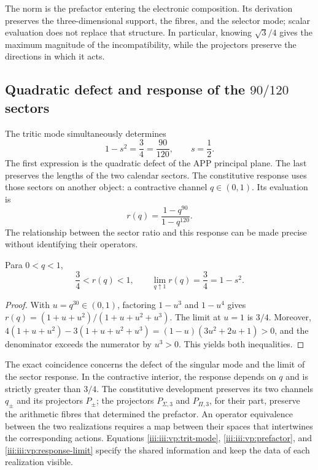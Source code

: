 The norm is the prefactor entering the electronic composition.
Its derivation preserves the three-dimensional support, the fibres, and the
selector mode; scalar evaluation does not replace that structure. In
particular, knowing $\sqrt3/4$ gives the maximum magnitude of
the incompatibility, while the projectors preserve the directions
in which it acts.

\clearpage
\subsection{Quadratic defect and response of the \(90/120\) sectors}

The tritic mode simultaneously determines
\begin{equation}
 1-s^2=\frac34=\frac{90}{120},\qquad s=\frac12.
 \label{iii:iii:vp:defect-ratio}
\end{equation}
The first expression is the quadratic defect of the APP principal plane.
The last preserves the lengths of the two calendar sectors.
The constitutive response uses those sectors on another object: a
contractive channel $q\in(0,1)$. Its evaluation is
\[
 r(q)=\frac{1-q^{90}}{1-q^{120}}.
\]
The relationship between the sector ratio and this response can be
made precise without identifying their operators.

\begin{proposition}
Para $0<q<1$,
\begin{equation}
 \frac34<r(q)<1,\qquad
 \lim_{q\uparrow1}r(q)=\frac34=1-s^2.
 \label{iii:iii:vp:response-limit}
\end{equation}
\end{proposition}
\begin{proof}
With $u=q^{30}\in(0,1)$, factoring $1-u^3$ and
$1-u^4$ gives
$r(q)=(1+u+u^2)/(1+u+u^2+u^3)$. The limit at $u=1$ is
$3/4$. Moreover,
$4(1+u+u^2)-3(1+u+u^2+u^3)
=(1-u)(3u^2+2u+1)>0$, and the denominator exceeds the numerator
by $u^3>0$. This yields both inequalities.
\end{proof}

The exact coincidence concerns the defect of the singular mode and the limit
of the sector response. In the contractive interior, the response
depends on $q$ and is strictly greater than $3/4$. The constitutive
development preserves its two channels $q_\pm$ and its projectors
$P_\pm$; the projectors $P_{\Sigma,3}$ and $P_{\Pi,3}$, for their
part, preserve the arithmetic fibres that determined the prefactor.
An operator equivalence between the two realizations requires a map
between their spaces that intertwines the corresponding actions.
Equations \eqref{iii:iii:vp:trit-mode}, \eqref{iii:iii:vp:prefactor}, and
\eqref{iii:iii:vp:response-limit} specify the shared information and
keep the data of each realization visible.

